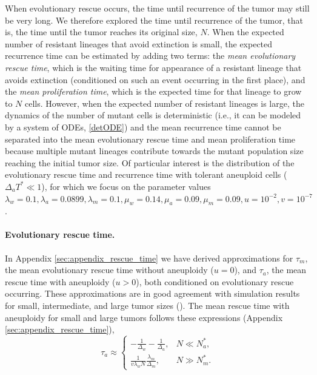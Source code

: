 \documentclass[12pt]{extarticle}
\begin{document}
When evolutionary rescue occurs, the time until recurrence of the tumor may still be very long. We therefore explored the time until recurrence of the tumor, that is, the time until the tumor reaches its original size, $N$.
When the expected number of resistant lineages that avoid extinction is small, the expected recurrence time can be estimated by adding two terms: the \emph{mean evolutionary rescue time}, which is the waiting time for appearance of a resistant lineage that avoids extinction (conditioned on such an event occurring in the first place), and the \emph{mean proliferation time}, which is the expected time for that lineage to grow to $N$ cells.
However, when the expected number of resistant lineages is large, the dynamics of the number of mutant cells is deterministic (i.e., it can be modeled by a system of ODEs, \cref{detODE}) and the mean recurrence time cannot be separated into the mean evolutionary rescue time and mean proliferation time because multiple mutant lineages contribute towards the mutant population size reaching the initial tumor size. %
Of particular interest is the distribution of the evolutionary rescue time and recurrence time with tolerant aneuploid cells ($\Delta_a T^*\ll1$), for which we focus on the parameter values  $\lambda_w=0.1, \lambda_a=0.0899,\lambda_m=0.1,\mu_w=0.14,\mu_a=0.09,\mu_m=0.09, u=10^{-2}, v=10^{-7}$ .

\paragraph{Evolutionary rescue time.}
In Appendix \ref{sec:appendix_rescue_time} we have derived approximations for $\tau_m$, the mean evolutionary rescue time without aneuploidy ($u=0$), and $\tau_a$, the mean rescue time with aneuploidy ($u>0$), both conditioned on evolutionary rescue occurring.
These approximations are in good agreement with simulation results for small, intermediate, and large tumor sizes ().
The mean rescue time with aneuploidy for small and large tumors follows these expressions (Appendix \ref{sec:appendix_rescue_time}),
\begin{equation}  \label{eq:AsymptoticTimeRules}
\tau_a \approx \begin{cases}
    -\frac{1}{\Delta_w}-\frac{1}{\Delta_a} ,&
 N \ll N_a^* ,\\ 
  \frac{1}{v\lambda_w N}   \frac{\lambda_m}{\Delta_m} ,& %
  N \gg N_m^* .
  \end{cases}
\end{equation}
\end{document}
